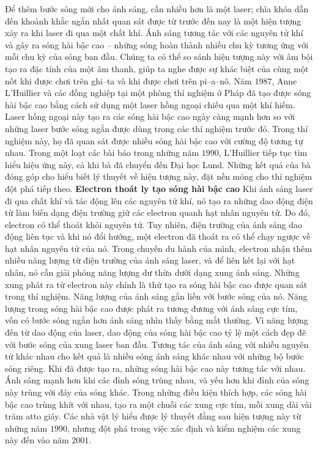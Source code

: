 \begin{multicols}{2}
	\vskip 0.1cm
	Để thêm bước sóng mới cho ánh sáng, cần nhiều hơn là một laser; chìa khóa dẫn đến khoảnh khắc ngắn nhất quan sát được từ trước đến nay là một hiện tượng xảy ra khi laser đi qua một chất khí. Ánh sáng tương tác với các nguyên tử khí và gây ra sóng hài bậc cao -- những sóng hoàn thành nhiều chu kỳ tương ứng với mỗi chu kỳ của sóng ban đầu. Chúng ta có thể so sánh hiện tượng này với âm bội tạo ra đặc tính của một âm thanh, giúp ta nghe được sự khác biệt của cùng một nốt khi được chơi trên ghi--ta và khi được chơi trên pi--a--nô.
	\vskip 0.1cm
	Năm $1987$, Anne L'Huillier và các đồng nghiệp tại một phòng thí nghiệm ở Pháp đã tạo được sóng hài bậc cao bằng cách sử dụng một laser hồng ngoại chiếu qua một khí hiếm. Laser hồng ngoại này tạo ra các sóng hài bậc cao ngày càng mạnh hơn so với những laser bước sóng ngắn được dùng trong các thí nghiệm trước đó. Trong thí nghiệm này, họ đã quan sát được nhiều sóng hài bậc cao với cường độ tương tự nhau.
	\vskip 0.1cm
	Trong một loạt các bài báo trong những năm $1990$, L'Huillier tiếp tục tìm hiểu hiệu ứng này, cả khi bà đã chuyển đến Đại học Lund. Những kết quả của bà đóng góp cho hiểu biết lý thuyết về hiện tượng này, đặt nền móng cho thí nghiệm đột phá tiếp theo.
	\vskip 0.1cm
	\textbf{\color{timhieukhoahoc}Electron thoát ly tạo sóng hài bậc cao}
	\vskip 0.1cm
	Khi ánh sáng laser đi qua chất khí và tác động lên các nguyên tử khí, nó tạo ra những dao động điện từ làm biến dạng điện trường giữ các electron quanh hạt nhân nguyên tử. Do đó, electron có thể thoát khỏi nguyên tử. Tuy nhiên, điện trường của ánh sáng dao động liên tục và khi nó đổi hướng, một electron đã thoát ra có thể chạy ngược về hạt nhân nguyên tử của nó. Trong chuyến du hành của mình, electron nhận thêm nhiều năng lượng từ điện trường của ánh sáng laser, và để liên kết lại với hạt nhân, nó cần giải phóng năng lượng dư thừa dưới dạng xung ánh sáng. Những xung phát ra từ electron này chính là thứ tạo ra sóng hài bậc cao được quan sát trong thí nghiệm.
	\vskip 0.1cm
	Năng lượng của ánh sáng gắn liền với bước sóng của nó. Năng lượng trong sóng hài bậc cao được phát ra tương đương với ánh sáng cực tím, vốn có bước sóng ngắn hơn ánh sáng nhìn thấy bằng mắt thường. Vì năng lượng đến từ dao động của laser, dao động của sóng hài bậc cao tỷ lệ một cách đẹp đẽ với bước sóng của xung laser ban đầu. Tương tác của ánh sáng với nhiều nguyên tử khác nhau cho kết quả là nhiều sóng ánh sáng khác nhau với những bộ bước sóng riêng.
	\vskip 0.1cm
	Khi đã được tạo ra, những sóng hài bậc cao này tương tác với nhau. Ánh sáng mạnh hơn khi các đỉnh sóng trùng nhau, và yếu hơn khi đỉnh của sóng này trùng với đáy của sóng khác. Trong những điều kiện thích hợp, các sóng hài bậc cao trùng khít với nhau, tạo ra một chuỗi các xung cực tím, mỗi xung dài vài trăm atto giây. Các nhà vật lý hiểu được lý thuyết đằng sau hiện tượng này từ những năm $1990$, nhưng đột phá trong việc xác định và kiểm nghiệm các xung này đến vào năm $2001$.

\end{multicols}
